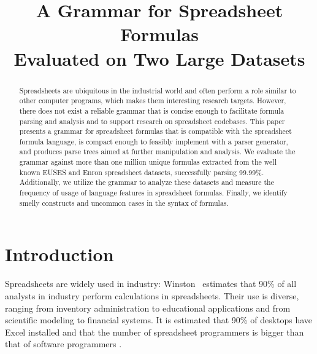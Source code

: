 \documentclass[conference]{IEEEtran}
\begin{document}
\title{A Grammar for Spreadsheet Formulas\\Evaluated on Two Large Datasets}

\author{
}
\maketitle

\begin{abstract}
Spreadsheets are ubiquitous in the industrial world and often perform a role similar to other computer programs, which makes them interesting research targets.
However, there does not exist a reliable grammar that is concise enough to facilitate formula parsing and analysis and to support research on spreadsheet codebases.
This paper presents a grammar for spreadsheet formulas that is compatible with the spreadsheet formula language, is compact enough to feasibly implement with a parser generator, and produces parse trees aimed at further manipulation and analysis. 
We evaluate the grammar against more than one million unique formulas extracted from the well known EUSES and Enron spreadsheet datasets, successfully parsing 99.99\%.
Additionally, we utilize the grammar to analyze these datasets and measure the frequency of usage of language features in spreadsheet formulas.
Finally, we identify smelly constructs and uncommon cases in the syntax of formulas.
\end{abstract}

\IEEEpeerreviewmaketitle

\section{Introduction}
Spreadsheets are widely used in industry: Winston~\cite{Wins2001} estimates that 90\% of all analysts in industry perform calculations in
spreadsheets. Their use is diverse, ranging from inventory administration to educational applications and from scientific
modeling to financial systems. It is estimated that 90\% of desktops have Excel installed \cite{DBLP:conf/icse/BradleyM09} and that the number of spreadsheet programmers is bigger than that of software programmers \cite{DBLP:conf/vl/ScaffidiSM05}. 
\end{document}
